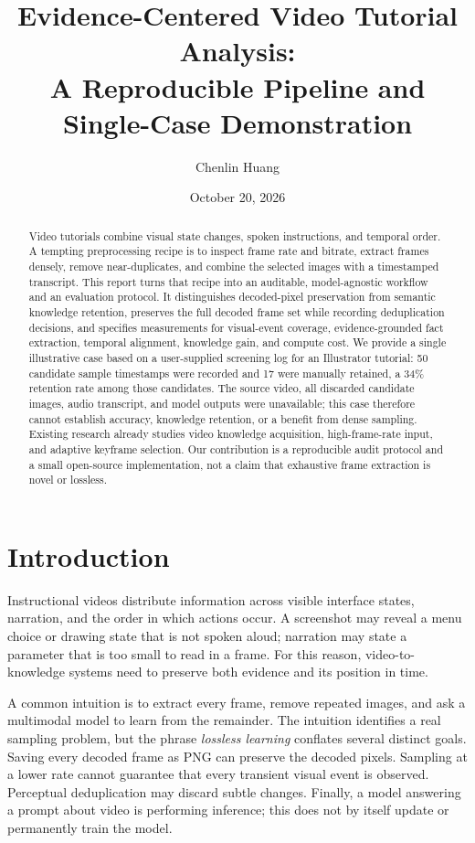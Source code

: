 \documentclass[11pt]{article}
\title{Evidence-Centered Video Tutorial Analysis:\\
A Reproducible Pipeline and Single-Case Demonstration}
\author{Chenlin Huang}
\date{October 20, 2026}
\begin{document}
\maketitle

\begin{abstract}
Video tutorials combine visual state changes, spoken instructions, and temporal order. A tempting preprocessing recipe is to inspect frame rate and bitrate, extract frames densely, remove near-duplicates, and combine the selected images with a timestamped transcript. This report turns that recipe into an auditable, model-agnostic workflow and an evaluation protocol. It distinguishes decoded-pixel preservation from semantic knowledge retention, preserves the full decoded frame set while recording deduplication decisions, and specifies measurements for visual-event coverage, evidence-grounded fact extraction, temporal alignment, knowledge gain, and compute cost. We provide a single illustrative case based on a user-supplied screening log for an Illustrator tutorial: 50 candidate sample timestamps were recorded and 17 were manually retained, a 34\% retention rate among those candidates. The source video, all discarded candidate images, audio transcript, and model outputs were unavailable; this case therefore cannot establish accuracy, knowledge retention, or a benefit from dense sampling. Existing research already studies video knowledge acquisition, high-frame-rate input, and adaptive keyframe selection. Our contribution is a reproducible audit protocol and a small open-source implementation, not a claim that exhaustive frame extraction is novel or lossless.
\end{abstract}

\section{Introduction}
Instructional videos distribute information across visible interface states, narration, and the order in which actions occur. A screenshot may reveal a menu choice or drawing state that is not spoken aloud; narration may state a parameter that is too small to read in a frame. For this reason, video-to-knowledge systems need to preserve both evidence and its position in time.

A common intuition is to extract every frame, remove repeated images, and ask a multimodal model to learn from the remainder. The intuition identifies a real sampling problem, but the phrase \textit{lossless learning} conflates several distinct goals. Saving every decoded frame as PNG can preserve the decoded pixels. Sampling at a lower rate cannot guarantee that every transient visual event is observed. Perceptual deduplication may discard subtle changes. Finally, a model answering a prompt about video is performing inference; this does not by itself update or permanently train the model.
\end{document}
